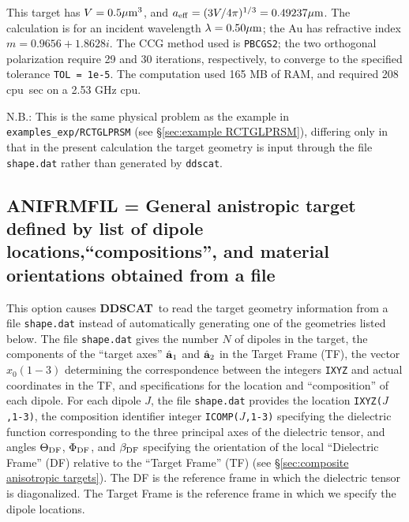 This target has $V=0.5{\mu{\rm m}}^3$, and ${a}_{\rm eff}=(3V/4\pi)^{1/3}=0.49237{\mu{\rm m}}$.
The calculation is for an incident wavelength $\lambda=0.50{\mu{\rm m}}$;
the Au has refractive index $m=0.9656+1.8628i$.  The CCG method used is
{\tt PBCGS2}; the two orthogonal polarization require 29 and 30 iterations,
respectively, to converge to the specified tolerance {\tt TOL = 1e-5}.
The computation used 165 MB of RAM, 
and required 208 cpu~sec on a 2.53 GHz cpu.
  
N.B.: This is the same physical problem as the example in
{\tt examples\_exp/RCTGLPRSM} (see \S\ref{sec:example RCTGLPRSM}), differing
only in that in the present calculation 
the target geometry is input through the file {\tt shape.dat}
rather than generated by {\tt ddscat}.


\subsection{ ANIFRMFIL = General anistropic target defined by list of dipole 
            locations,``compositions'', and material orientations obtained 
            from a file
            \label{sec:ANIFRMFIL}}
	This option causes {{\bf DDSCAT}}\ to read the target geometry
	information from a file {\tt shape.dat} instead of automatically
	generating one of the geometries listed below.  
	The file {\tt shape.dat} gives the number $N$ of dipoles in the
	target, the components of the 
	``target axes'' $\hat{\bf a}_1$ and $\hat{\bf a}_2$ in
	the Target Frame (TF), the vector $x_0(1-3)$ determining the
	correspondence between the integers {\tt IXYZ} and
	actual coordinates in the TF, and specifications for the
	location and ``composition'' of each dipole.
	For each dipole $J$, the file {\tt shape.dat} provides  the location
	{\tt IXYZ($J$,1-3)}, the composition identifier integer 
	{\tt ICOMP($J$,1-3)} specifying the
	dielectric function corresponding to the three principal axes of
	the dielectric tensor, and angles $\Theta_{\rm DF}$,
	$\Phi_{\rm DF}$, and $\beta_{\rm DF}$ specifying the orientation of the
	local 
	``Dielectric Frame'' (DF) relative to the ``Target Frame'' (TF)
	(see \S\ref{sec:composite anisotropic targets}).
	The DF is the reference frame in which the dielectric tensor is
	diagonalized.
	The Target Frame is the reference frame in which we specify the
	dipole locations.

